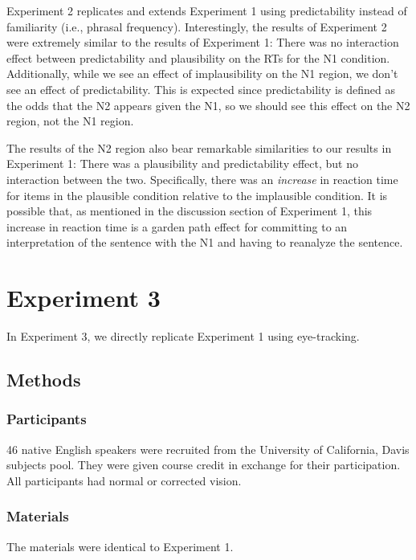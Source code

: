 \documentclass[
  12pt,
  letterpaper,
]{scrreprt}
\begin{document}
Experiment 2 replicates and extends Experiment 1 using predictability
instead of familiarity (i.e., phrasal frequency). Interestingly, the
results of Experiment 2 were extremely similar to the results of
Experiment 1: There was no interaction effect between predictability and
plausibility on the RTs for the N1 condition. Additionally, while we see
an effect of implausibility on the N1 region, we don't see an effect of
predictability. This is expected since predictability is defined as the
odds that the N2 appears given the N1, so we should see this effect on
the N2 region, not the N1 region.

The results of the N2 region also bear remarkable similarities to our
results in Experiment 1: There was a plausibility and predictability
effect, but no interaction between the two. Specifically, there was an
\emph{increase} in reaction time for items in the plausible condition
relative to the implausible condition. It is possible that, as mentioned
in the discussion section of Experiment 1, this increase in reaction
time is a garden path effect for committing to an interpretation of the
sentence with the N1 and having to reanalyze the sentence.

\section{Experiment 3}\label{experiment-3}

In Experiment 3, we directly replicate Experiment 1 using eye-tracking.

\subsection{Methods}\label{methods-2}

\subsubsection{Participants}\label{participants-2}

46 native English speakers were recruited from the University of
California, Davis subjects pool. They were given course credit in
exchange for their participation. All participants had normal or
corrected vision.

\subsubsection{Materials}\label{materials}

The materials were identical to Experiment 1.
\end{document}
